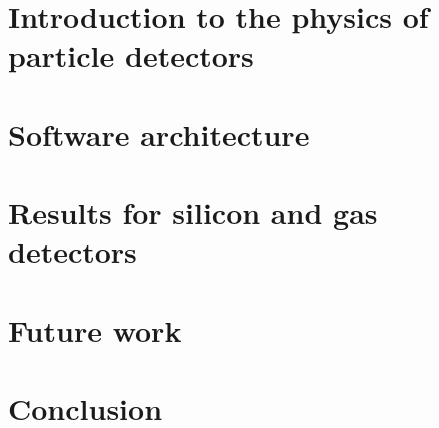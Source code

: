 \documentclass[11pt]{article}
\begin{document}
\section{Introduction to the physics of particle detectors}

\section{Software architecture}

\section{Results for silicon and gas detectors}

\section{Future work}

\section{Conclusion}

\newpage



\end{document}
